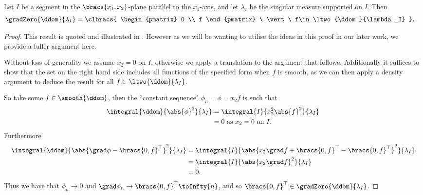 \begin{prop} \label{prop:GradZeroParallelZhikov}
	Let $I$ be a segment in the $\bracs{x_1,x_2}$-plane parallel to the $x_1$-axis, and let $\lambda_I$ be the singular measure supported on $I$.
	Then 
	\begin{align*}
		\gradZero{\ddom}{\lambda_I} &= 
		\clbracs{
			\begin{pmatrix} 0 \\ f	\end{pmatrix}
			\ \vert \ f\in\ltwo{\ddom}{\lambda_I}
		}.
	\end{align*}
\end{prop}
\begin{proof}
	This result is quoted and illustrated in \cite{zhikov2000extension}.
	However as we will be wanting to utilise the ideas in this proof in our later work, we provide a fuller argument here. \newline

	Without loss of generality we assume $x_2=0$ on $I$, otherwise we apply a translation to the argument that follows.
	Additionally it suffices to show that the set on the right hand side includes all functions of the specified form when $f$ is smooth, as we can then apply a density argument to deduce the result for all $f\in\ltwo{\ddom}{\lambda_I}$. \newline
	
	So take some $f\in\smooth{\ddom}$, then the ``constant sequence" $\phi_n = \phi = x_2 f$ is such that
	\begin{align*}
		\integral{\ddom}{\abs{\phi}^2}{\lambda_I} &= \integral{I}{x_2^2\abs{f}^2}{\lambda_I} \\
		&= 0 \text{ as } x_2=0 \text{ on } I.
	\end{align*}
	Furthermore
	\begin{align*}
		\integral{\ddom}{\abs{\grad\phi - \bracs{0, f}^\top }^2}{\lambda_I}
		&= \integral{I}{\abs{ x_2\grad f + \bracs{0, f}^\top - \bracs{0,f}^\top }^2}{\lambda_I} \\
		&= \integral{I}{\abs{ x_2\grad f }^2}{\lambda_I} \\
		&= 0.
	\end{align*}
	Thus we have that $\phi_n\rightarrow0$ and $\grad\phi_n\rightarrow\bracs{0,f}^\top \toInfty{n}$, and so $\bracs{0,f}^\top\in\gradZero{\ddom}{\lambda_I}$. \newline
	

\end{proof}
